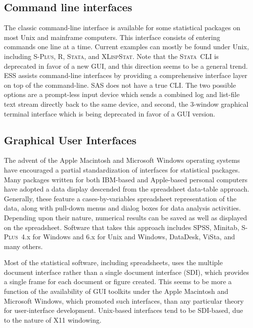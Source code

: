 \documentclass{article}
\newcommand*{\Splus}{\textsc{S-Plus}}
\newcommand*{\XLispStat}{\textsc{XLispStat}}
\newcommand*{\Stata}{\textsc{Stata}}
\begin{document}
\subsection{Command line interfaces}
\label{sec:UI:command}

The classic command-line interface is available for some statistical
packages on most Unix and mainframe computers.  This interface
consists of entering commands one line at a time.  Current examples can
mostly be found under Unix, including \Splus, R, \Stata, and \XLispStat.
Note that the \Stata\ CLI is deprecated in favor of a new GUI, and
this direction seems to be a general trend.  ESS assists command-line
interfaces by providing a comprehensive interface layer on top of the
command-line.  SAS does not have a true CLI.  The two possible options
are a prompt-less input device which sends a combined log and
list-file text stream directly back to the same device, and second,
the 3-window graphical terminal interface which is being deprecated
in favor of a GUI version.

\subsection{Graphical User Interfaces}
\label{sec:UI:GUI}

The advent of the Apple Macintosh and Microsoft Windows operating
systems have encouraged a partial standardization of interfaces for
statistical packages.  Many packages written for both IBM-based and
Apple-based personal computers have adopted a data display descended
from the spreadsheet data-table approach.  Generally, these feature a
cases-by-variables spreadsheet representation of the data, along with
pull-down menus and dialog boxes for data analysis activities.
Depending upon their nature, numerical results can be saved as well as
displayed on the spreadsheet.  Software that takes this approach
includes SPSS, Minitab, \Splus\ 4.x for Windows and 6.x for Unix and
Windows, DataDesk, ViSta, and many others.

Most of the statistical software, including spreadsheets, uses the
multiple document interface rather than a single document interface
(SDI), which provides a single frame for each document or figure
created.  This seems to be more a function of the availability of GUI
toolkits under the Apple Macintosh and Microsoft Windows, which
promoted such interfaces, than any particular theory for
user-interface development.  Unix-based interfaces tend to be
SDI-based, due to the nature of X11 windowing.
\end{document}
